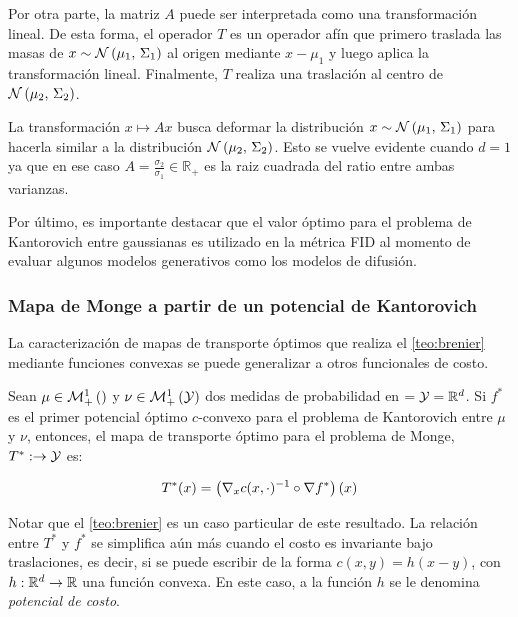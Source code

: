 Por otra parte, la matriz $A$ puede ser interpretada como una transformación lineal. De esta forma, el operador $T$ es un operador afín que primero traslada las masas de $x\sim \mathcal{N}\left(\mu_1,\,\Sigma_1\right)$ al origen mediante $x-\mu_1$ y luego aplica la transformación lineal. Finalmente, $T$ realiza una traslación al centro de $\mathcal{N}\left(\mu_2,\,\Sigma_2\right)$.

La transformación $x\mapsto Ax$ busca deformar la distribución $x\sim \mathcal{N}\left(\mu_1,\,\Sigma_1\right)$ para hacerla similar a la distribución $\mathcal{N}\left(\mu_2,\,\Sigma_2\right)$. Esto se vuelve evidente cuando $d=1$ ya que en ese caso $A=\frac{\sigma_2}{\sigma_1} \in\mathbb{R}_+$ es la raiz cuadrada del ratio entre ambas varianzas.

Por último, es importante destacar que el valor óptimo para el problema de Kantorovich entre gaussianas es utilizado en la métrica FID al momento de evaluar algunos modelos generativos como los modelos de difusión.

\subsubsection{Mapa de Monge a partir de un potencial de Kantorovich}

La caracterización de mapas de transporte óptimos que realiza el \autoref{teo:brenier} mediante funciones convexas se puede generalizar a otros funcionales de costo.

\begin{teo}
	\label{teo:gangbo_mccann}
	Sean $\mu\in\mathcal{M}_+^1\left(\right)$ y $\nu\in\mathcal{M}_+^1\left(\mathcal{Y}\right)$ dos medidas de probabilidad en $=\mathcal{Y}=\mathbb{R}^d$. Si $f^*$ es el primer potencial óptimo $c$-convexo para el problema de Kantorovich entre $\mu$ y $\nu$, entonces, el mapa de transporte óptimo para el problema de Monge, $T^*:\to\mathcal{Y}$ es:

	\begin{equation*}
		T^*(x) = \left(\nabla_x c(x,\cdot)^{-1}\circ \nabla f^*\right)(x)
	\end{equation*}
\end{teo}

Notar que el \autoref{teo:brenier} es un caso particular de este resultado. La relación entre $T^*$ y $f^*$ se simplifica aún más cuando el costo es invariante bajo traslaciones, es decir, si se puede escribir de la forma $c(x,y)=h(x-y)$, con $h:\mathbb{R}^d\to\mathbb{R}$ una función convexa. En este caso, a la función $h$ se le denomina \textit{potencial de costo}.

